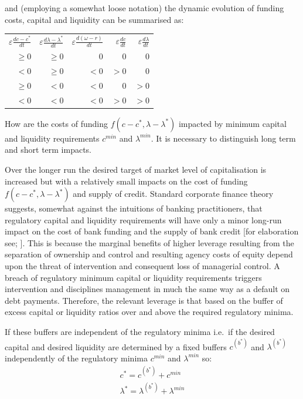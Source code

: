 \documentclass[
  12,
]{article}
\begin{document}
and (employing a somewhat loose notation) the dynamic evolution of funding costs, capital and liquidity can be summarised as:

\begin{center}
\begin{tabular}{ r r r r r}
$\varepsilon\frac{{d}c-c^\ast}{{d}t}$&
$\varepsilon\frac{{d}\lambda-\lambda^\ast}{{d}t}$&
$\varepsilon\frac{{d}(\omega- r)}{{d}t}$&
$\varepsilon\frac{{d}c}{{d}t}$&
$\varepsilon\frac{{d}\lambda}{{d}t} $\\
$\geq 0$&$\geq 0$&$0$&$0$&$0$\\
$<0$&$\geq 0$&$<0$&$>0$&$0$\\
$\geq 0$&$<0$&$<0$&$0$&$>0$\\
$<0$&$<0$&$<0$&$>0$&$>0$
\end{tabular}
\end{center}

How are the costs of funding \(f(c-c^\ast,\lambda-\lambda^\ast)\) impacted by minimum capital and liquidity requirements \(c^{min}\) and \(\lambda^{min}\). It is necessary to distinguish long term and short term impacts.

Over the longer run the desired target of market level of capitalisation is increased but with a relatively small impacts on the cost of funding \(f(c-c^\ast,\lambda-\lambda^\ast)\) and supply of credit. Standard corporate finance theory suggests, somewhat against the intuitions of banking practitioners, that regulatory capital and liquidity requirements will have only a minor long-run impact on the cost of bank funding and the supply of bank credit {[}for elaboration see; \citet{hellwig2014bankers}{]}. This is because the marginal benefits of higher leverage resulting from the separation of ownership and control and resulting agency costs of equity depend upon the threat of intervention and consequent loss of managerial control. A breach of regulatory minimum capital or liquidity requirements triggers intervention and disciplines management in much the same way as a default on debt payments. Therefore, the relevant leverage is that based on the buffer of excess capital or liquidity ratios over and above the required regulatory minima.

If these buffers are independent of the regulatory minima i.e.~if the desired capital and desired liquidity are determined by a fixed buffers \(c^{(b^*)}\) and \(\lambda^{(b^*)}\) independently of the regulatory minima \(c^{min}\) and \(\lambda^{min}\) so:
\[
\begin{split}
c^*=c^{(b^*)}+c^{min} \\
\lambda^\ast=\lambda^{(b^*)}+\lambda^{min} 
\end{split}
\]
\end{document}

